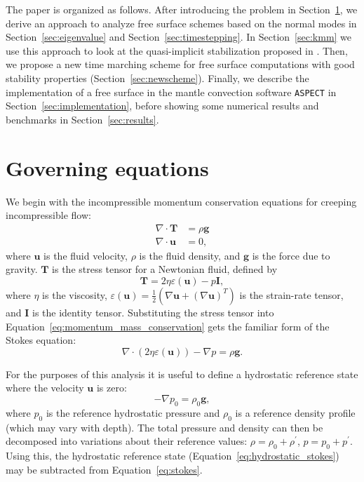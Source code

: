 \documentclass[preprint,12pt,authoryear]{elsarticle}
\begin{document}
The paper is organized as follows.
After introducing the problem in Section~\ref{sec:governing},
we derive an approach to analyze 
free surface schemes based on the normal modes in Section~\ref{sec:eigenvalue}
and Section~\ref{sec:timestepping}.
In Section~\ref{sec:kmm} we use this approach to look at the
quasi-implicit stabilization proposed in \citet{kaus2010stabilization}.
Then, we propose a new time marching scheme for free surface computations with 
good stability properties (Section~\ref{sec:newscheme}).
Finally, we describe the implementation of a free surface in the mantle convection software \texttt{ASPECT} in Section~\ref{sec:implementation}, 
before showing some numerical results and benchmarks in Section~\ref{sec:results}. 


\section{Governing equations}
\label{sec:governing}

We begin with the incompressible momentum conservation equations for creeping incompressible flow:
\begin{equation}
\begin{aligned}
\nabla \cdot \mathbf{T} &= \rho \mathbf{g} \\
\nabla \cdot \mathbf{u} &= 0,
\end{aligned}
\label{eq:momentum_mass_conservation}
\end{equation}
where $\mathbf{u}$ is the fluid velocity, $\rho$ is the fluid density, and $\mathbf{g}$ is the force due to gravity.
$\mathbf{T}$ is the stress tensor for a Newtonian fluid, defined by
\begin{equation}
\mathbf{T} = 2 \eta \varepsilon(\mathbf{u}) - p \mathbf{I},
\label{eq:stress_tensor}
\end{equation}
where $\eta$ is the viscosity, $\varepsilon(\mathbf{u}) = \frac{1}{2}(\nabla \mathbf{u} + (\nabla \mathbf{u} )^T )$
is the strain-rate tensor, and $\mathbf{I}$ is the identity tensor.
Substituting the stress tensor into Equation~\eqref{eq:momentum_mass_conservation} gets the familiar form of the Stokes equation:
\begin{equation}
\nabla \cdot \left( 2 \eta \varepsilon( \mathbf{u} ) \right) - \nabla p = \rho \mathbf{g}.
\label{eq:stokes}
\end{equation}

For the purposes of this analysis it is useful to define a hydrostatic reference state where the 
velocity $\mathbf{u}$ is zero:
\begin{equation}
- \nabla p_0 = \rho_0 \mathbf{g},
\label{eq:hydrostatic_stokes}
\end{equation}
where $p_0$ is the reference hydrostatic pressure and $\rho_0$ is a reference density profile (which may vary with depth).
The total pressure and density can then be decomposed into variations about their 
reference values: $\rho = \rho_0 + \rho^\prime$, $p = p_0 + p^\prime$.
Using this, the hydrostatic reference state (Equation~\eqref{eq:hydrostatic_stokes}) may be subtracted from Equation~\eqref{eq:stokes}.
\end{document}

